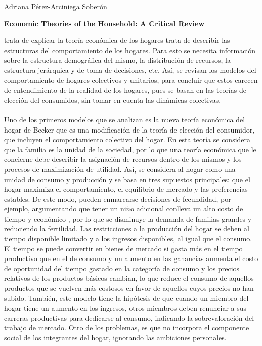 \documentclass[11pt,spanish,letterpaper]{article}
\theoremstyle{plain}
\begin{document}
\begin{flushleft}
Adriana P\'erez-Arciniega Sober\'on
\end{flushleft}
\begin{center}
\textbf{Economic Theories of the Household: A Critical Review}
\end{center}
\cite{mattila1999working} trata de explicar la teor\'ia econ\'omica de los hogares trata de describir las estructuras del comportamiento de los hogares. Para esto se necesita informaci\'on sobre la estructura demogr\'afica del mismo, la distribuci\'on de recursos, la estructura jer\'arquica y de toma de decisiones, etc. As\'i, se revisan los modelos del comportamiento de hogares colectivos y unitarios, para concluir que estos carecen de entendimiento de la realidad de los hogares, pues se basan en las teor\'ias de elecci\'on del consumidos, sin tomar en cuenta las din\'amicas colectivas.\\
\\
Uno de los primeros modelos que se analizan es la nueva teor\'ia econ\'omica del hogar de Becker que es una modificaci\'on de la teor\'ia de elecci\'on del consumidor, que incluyen el comportamiento colectivo del hogar. En esta teor\'ia se considera que la familia es la unidad de la sociedad, por lo que una teor\'ia econ\'omica que le concierne debe describir la asignaci\'on de recursos dentro de los mismos y los procesos de maximizaci\'on de utilidad. As\'i, se considera al hogar como una unidad de consumo y producci\'on y se basa en tres supuestos principales: que el hogar maximiza el comportamiento, el equilibrio de mercado y las preferencias estables. De este modo, pueden enmarcarse decisiones de fecundidad, por ejemplo, argumentando que tener un ni$\tilde{n}$o adicional conlleva un alto costo de tiempo y econ\'omico , por lo que se disminuye la demanda de familias grandes y reduciendo la fertilidad. Las restricciones a la producci\'on del hogar se deben al tiempo disponible limitado y a los ingresos disponibles, al igual que el consumo. El tiempo se puede convertir en bienes de mercado si gasta m\'as en el tiempo productivo que en el de consumo y un aumento en las ganancias aumenta el costo de oportunidad del tiempo gastado en la categor\'ia de consumo y los precios relativos de los productos b\'asicos cambian, lo que reduce el consumo de aquellos productos que se vuelven m\'as costosos en favor de aquellos cuyos precios no han subido. Tambi\'en, este modelo tiene la hip\'otesis de que cuando un miembro del hogar tiene un aumento en los ingresos, otros miembros deben renunciar a sus carreras productivas para dedicarse al consumo, indicando la sobrevaloraci\'on del trabajo de mercado. Otro de los problemas, es que no incorpora el componente social de los integrantes del hogar, ignorando las ambiciones personales. \\
\end{document}
